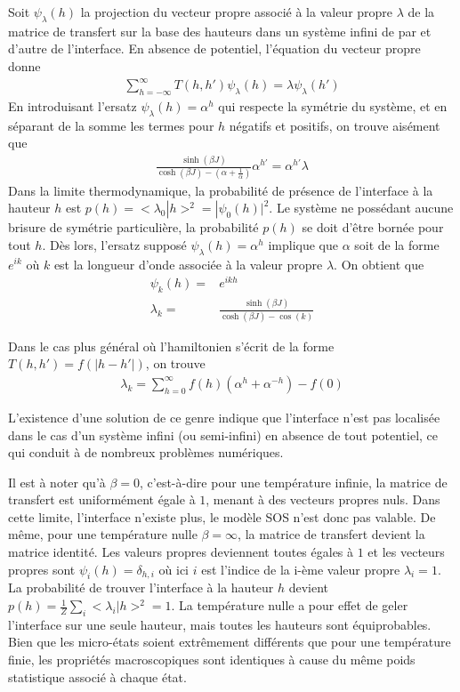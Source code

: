 	Soit $\psi_\lambda(h)$ la projection du vecteur propre associé à la valeur propre $\lambda$ de la matrice de transfert sur la base des hauteurs dans un système infini de par et d'autre de l'interface. En absence de potentiel\cite{guyer1979}, l'équation du vecteur propre donne
\begin{align}
	\sum_{h=-\infty}^\infty T(h,h') \psi_\lambda(h) = \lambda \psi_\lambda(h')
\end{align}
En introduisant l'ersatz $\psi_\lambda(h) = \alpha^h$ qui respecte la symétrie du système, et en séparant de la somme les termes pour $h$ négatifs et positifs, on trouve aisément que 
\begin{align}
	\frac{\sinh(\beta J)}{\cosh(\beta J)-(\alpha+\frac{1}{\alpha})} \alpha^{h'} = \alpha^{h'} \lambda
\end{align}
Dans la limite thermodynamique, la probabilité de présence de l'interface à la hauteur $h$ est $p(h) = <\lambda_0|h>^2 = |\psi_0(h)|^2$. Le système ne possédant aucune brisure de symétrie particulière, la probabilité $p(h)$ se doit d'être bornée pour tout $h$. Dès lors, l'ersatz supposé $\psi_\lambda(h) = \alpha^h$ implique que $\alpha$ soit de la forme $e^{ik}$ où $k$ est la longueur d'onde associée à la valeur propre $\lambda$. On obtient que 
\begin{align}
	\psi_k(h) =& e^{ikh} \\
	\lambda_k =& \frac{\sinh(\beta J)}{\cosh(\beta J) - \cos(k)}
\end{align}


Dans le cas plus général où l'hamiltonien s'écrit de la forme $T(h,h') = f(|h-h'|)$, on trouve 
\begin{align}
	\lambda_k = \sum_{h=0}^\infty f(h)(\alpha^h+\alpha^{-h}) - f(0)
\end{align}

L'existence d'une solution de ce genre indique que l'interface n'est pas localisée dans le cas d'un système infini (ou semi-infini) en absence de tout potentiel, ce qui conduit à de nombreux problèmes numériques. 

Il est à noter qu'à $\beta=0$, c'est-à-dire pour une température infinie, la matrice de transfert est uniformément égale à $1$, menant à des vecteurs propres nuls. Dans cette limite, l'interface n'existe plus, le modèle SOS n'est donc pas valable. De même, pour une température nulle $\beta=\infty$, la matrice de transfert devient la matrice identité. Les valeurs propres deviennent toutes égales à $1$ et les vecteurs propres sont $\psi_i(h) = \delta_{h,i}$ où ici $i$ est l'indice de la i-ème valeur propre $\lambda_i = 1$. La probabilité de trouver l'interface à la hauteur $h$ devient $p(h) = \frac{1}{Z}\sum_{i} <\lambda_i | h >^2 = 1$. La température nulle a pour effet de geler l'interface sur une seule hauteur, mais toutes les hauteurs sont équiprobables. Bien que les micro-états soient extrêmement différents que pour une température finie, les propriétés macroscopiques sont identiques à cause du même poids statistique associé à chaque état.


